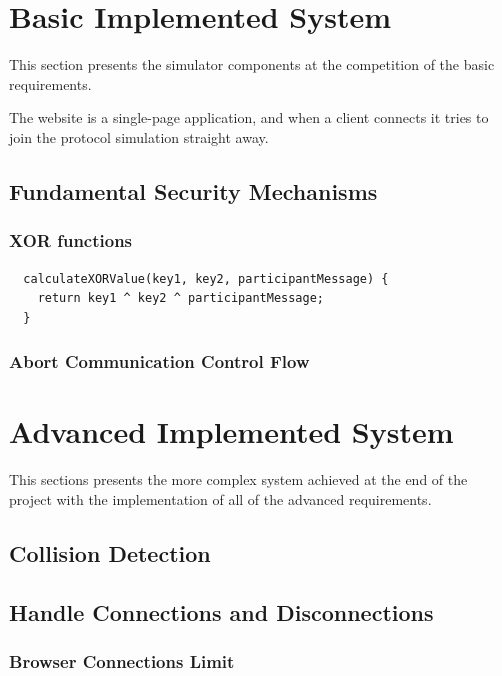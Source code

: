 \section{Basic Implemented System}
This section presents the simulator components at the competition of the basic requirements.

The website is a single-page application, and when a client connects it tries to join the protocol simulation straight away.




\subsection{Fundamental Security Mechanisms}

\subsubsection{XOR functions}



\begin{lstlisting}
  calculateXORValue(key1, key2, participantMessage) {
    return key1 ^ key2 ^ participantMessage;
  }
\end{lstlisting}


\subsubsection{Abort Communication Control Flow}


\section{Advanced Implemented System}
This sections presents the more complex system achieved at the end of the project with the implementation of all of the advanced requirements.

\subsection{Collision Detection}

\subsection{Handle Connections and Disconnections}

\subsubsection{Browser Connections Limit}

